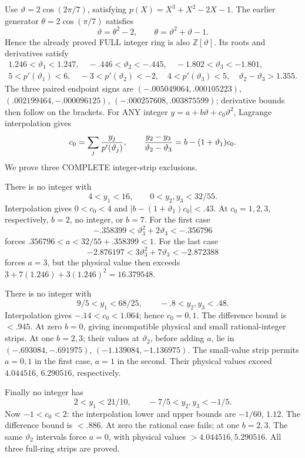 \documentclass[11pt]{article}
\begin{document}
Use \(\vartheta=2\cos(2\pi/7)\), satisfying
\(p(X)=X^3+X^2-2X-1\).
The earlier generator \(\theta=2\cos(\pi/7)\)
satisfies
\[
           \vartheta=\theta^2-2,\qquad
           \theta=\vartheta^2+\vartheta-1 .
\]
Hence the already proved FULL integer ring
is also \(\mathbb Z[\vartheta]\).
Its roots and derivatives satisfy
\[
\begin{gathered}
 1.246<\vartheta_1<1.247,\quad
 -.446<\vartheta_2<-.445,\quad
 -1.802<\vartheta_3<-1.801,\\
 5<p'(\vartheta_1)<6,\quad-3<p'(\vartheta_2)<-2,\quad
 4<p'(\vartheta_3)<5,\quad\vartheta_2-\vartheta_3>1.355 .
\end{gathered}
\]
The three paired endpoint signs are
\((-.005049064,.000105223)\),
\((.002199464,-.000096125)\),
\((-.000257608,.003875599)\);
derivative bounds then follow on the brackets.
For ANY integer \(y=a+b\vartheta+c_0\vartheta^2\),
Lagrange interpolation gives
\[
 c_0=\sum_j{y_j\over p'(\vartheta_j)},\qquad
 {y_2-y_3\over\vartheta_2-\vartheta_3}
                 =b-(1+\vartheta_1)c_0 .
\]
We prove three COMPLETE integer-strip exclusions.

There is no integer with
\[
              4<y_1<16,\qquad0<y_2,y_3<32/55 .
\tag{A15stripA}\label{eq:arithA15typedstripA}
\]
Interpolation gives \(0<c_0<4\) and
\(|b-(1+\vartheta_1)c_0|<.43\).
At \(c_0=1,2,3\), respectively,
\(b=2\), no integer, or \(b=7\).
For the first case
\[
          -.358399<\vartheta_3^2+2\vartheta_3<-.356796
\]
forces \(.356796<a<32/55+.358399<1\).
For the last case
\[
           -2.876197<3\vartheta_3^2+7\vartheta_3<-2.872388
\]
forces \(a=3\), but the physical value then
exceeds \(3+7(1.246)+3(1.246)^2=16.379548\).

There is no integer with
\[
                9/5<y_1<68/25,\qquad-.8<y_2,y_3<.48 .
\tag{A15stripB}\label{eq:arithA15typedstripB}
\]
Interpolation gives \(-.14<c_0<1.064\);
hence \(c_0=0,1\).
The difference bound is \(<.945\).
At zero \(b=0\), giving incompatible
physical and small rational-integer strips.
At one \(b=2,3\); their values at
\(\vartheta_2\), before adding \(a\), lie in
\((-.693084,-.691975)\),
\((-1.139084,-1.136975)\).
The small-value strip permits \(a=0,1\)
in the first case, \(a=1\) in the second.
Their physical values exceed \(4.044516\),
\(6.290516\), respectively.

Finally no integer has
\[
                   2<y_1<21/10,\qquad-7/5<y_2,y_3<-1/5 .
\tag{A15stripC}\label{eq:arithA15typedstripC}
\]
Now \(-1<c_0<2\):
the interpolation lower and upper bounds
are \(-1/60\), \(1.12\).
The difference bound is \(<.886\).
At zero the rational case fails;
at one \(b=2,3\).
The same \(\vartheta_2\) intervals force
\(a=0\), with physical values
\(>4.044516,5.290516\).
All three full-ring strips are proved.
\end{document}

